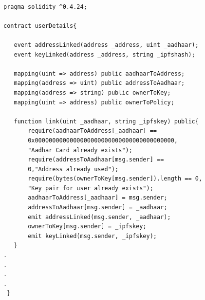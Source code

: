 \clearpage
{}
\begin{lstlisting}[frame=single]

pragma solidity ^0.4.24;

contract userDetails{
  
   event addressLinked(address _address, uint _aadhaar);
   event keyLinked(address _address, string _ipfshash);

   mapping(uint => address) public aadhaarToAddress;
   mapping(address => uint) public addressToAadhaar;
   mapping(address => string) public ownerToKey;
   mapping(uint => address) public ownerToPolicy;
    
   function link(uint _aadhaar, string _ipfskey) public{
       require(aadhaarToAddress[_aadhaar] ==
       0x0000000000000000000000000000000000000000,
       "Aadhar Card already exists");
       require(addressToAadhaar[msg.sender] == 
       0,"Address already used");
       require(bytes(ownerToKey[msg.sender]).length == 0,
       "Key pair for user already exists");
       aadhaarToAddress[_aadhaar] = msg.sender;
       addressToAadhaar[msg.sender] = _aadhaar;
       emit addressLinked(msg.sender, _aadhaar);
       ownerToKey[msg.sender] = _ipfskey;
       emit keyLinked(msg.sender, _ipfskey);      
   }
.
.
.
.
 }

\end{lstlisting}

